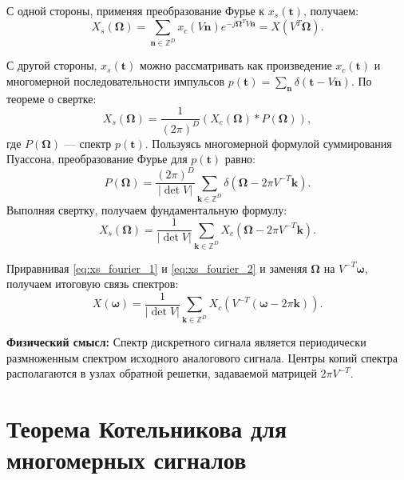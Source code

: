 \documentclass[12pt, a4paper]{article}
\begin{document}
С одной стороны, применяя преобразование Фурье к $x_s(\mathbf{t})$, получаем:
\begin{equation} \label{eq:xs_fourier_1}
    X_s(\boldsymbol{\Omega}) = \sum_{\mathbf{n} \in \mathbb{Z}^D} x_c(V \mathbf{n}) e^{-j \boldsymbol{\Omega}^T V \mathbf{n}} = X(V^T \boldsymbol{\Omega}).
\end{equation}

С другой стороны, $x_s(\mathbf{t})$ можно рассматривать как произведение $x_c(\mathbf{t})$ и многомерной последовательности импульсов $p(\mathbf{t}) = \sum_{\mathbf{n}} \delta(\mathbf{t} - V \mathbf{n})$. По теореме о свертке:
\begin{equation}
    X_s(\boldsymbol{\Omega}) = \frac{1}{(2\pi)^D} \left( X_c(\boldsymbol{\Omega}) * P(\boldsymbol{\Omega}) \right),
\end{equation}
где $P(\boldsymbol{\Omega})$ --- спектр $p(\mathbf{t})$. Пользуясь многомерной формулой суммирования Пуассона, преобразование Фурье для $p(\mathbf{t})$ равно:
\begin{equation}
    P(\boldsymbol{\Omega}) = \frac{(2\pi)^D}{|\det V|} \sum_{\mathbf{k} \in \mathbb{Z}^D} \delta(\boldsymbol{\Omega} - 2\pi V^{-T} \mathbf{k}).
\end{equation}
Выполняя свертку, получаем фундаментальную формулу:
\begin{equation} \label{eq:xs_fourier_2}
    X_s(\boldsymbol{\Omega}) = \frac{1}{|\det V|} \sum_{\mathbf{k} \in \mathbb{Z}^D} X_c(\boldsymbol{\Omega} - 2\pi V^{-T} \mathbf{k}).
\end{equation}

Приравнивая \eqref{eq:xs_fourier_1} и \eqref{eq:xs_fourier_2} и заменяя $\boldsymbol{\Omega}$ на $V^{-T} \boldsymbol{\omega}$, получаем итоговую связь спектров:
\begin{equation} \label{eq:spectra_relation}
    X(\boldsymbol{\omega}) = \frac{1}{|\det V|} \sum_{\mathbf{k} \in \mathbb{Z}^D} X_c \left( V^{-T}(\boldsymbol{\omega} - 2\pi \mathbf{k}) \right).
\end{equation}

\textbf{Физический смысл:} Спектр дискретного сигнала является периодически размноженным спектром исходного аналогового сигнала. Центры копий спектра располагаются в узлах обратной решетки, задаваемой матрицей $2\pi V^{-T}$.

\section{Теорема Котельникова для многомерных сигналов}
\end{document}
